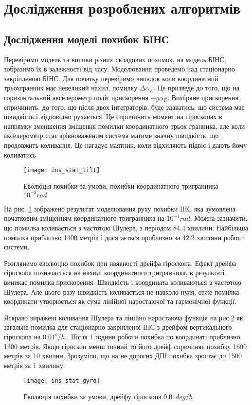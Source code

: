 \section{Дослідження розроблених алгоритмів}

\subsection{Дослідження моделі похибок БІНС}

Перевіримо модель та впливи різних складових похимок, на модель БІНС, зобразимо їх в
залежності від часу. Моделювання проведемо над стаціонарно закріпленою БІНС.
Для початку перевіримо випадок коли координатний трьохгранник має невеликий нахил,
помилку $\Delta \alpha_{E}$. Це призведе до того, що на горизонтальний акселерометр
подіє прискорення $-g \alpha_{E}$. Виміряне прискорення спричинить, до того, що після
двох інтеграторів, буде здаватись, що система має швидкість і відповідно рухається.
Це спричинить момент на гіроскопах в напрямку зменшення зміщення помилки
координатного трьох гранника, але коли акселерометр стає зрівноваженим система 
матиме значну швидкість, що продовжить коливання. Це нагадує маятник, коли відхиляють
підвіс і дають йому коливатись

\begin{figure}[here]
\centering
\texttt{[image: ins\_stat\_tilt]}
\caption{Еволюція похибки за умови, похибки координатного тригранника $10^{-3} rad$}
\label{fig:ins_stat_tilt}
\end{figure}

На рис. \ref{fig:ins_stat_tilt} зображено результат моделювання руху похибки ІНС
яка зумовлена початковим зміщенням координатного тригранника на $10^{-3} rad$.
Можна зазначити, що помилка коливається з частотою Шулера, з періодом 84.4 хвилини.
Найбільша помилка приблизно 1300 метрів і досягається приблизно за 42.2 хвилини роботи системи.

Розглянемо еволюцію похибок при наявності дрейфа гіроскопа. Ефект дрейфа гіроскопа позначається на нахилі координатного тригранника, в результаті виникає помилка прискорення. Швидкість і координата коливаються з частотою Шулера. Але цього разу швидкість
коливається не навколо нуля, отже помилка координати утворюється як сума лінійної наростаючої та гармонічної функції.

 Яскраво виражені коливання Шулера та лінійно наростаюча функція на рис.\ref{fig:ins_stat_gyro} як загальна помилка для стаціонарно закріпленої ІНС з дрейфом вертикального гіроскопа на $0.01^{o}/h$,. Після 1 години роботи похибка по координаті приблизно 1300 метрів. Якщо гіроскоп менш точний то його дрейф спричиняє похибку 1600 метрів за 10 хвилин. Зрозуміло, що на не дорогих ДПІ похибка зростає до 1500 метрів за 1 хвилину.
\begin{figure}[here]
\centering
\texttt{[image: ins\_stat\_gyro]}
\caption{Еволюція похибки за умови, дрейфу гіроскопа $0.01 deg/h$}
\label{fig:ins_stat_gyro}
\end{figure}

